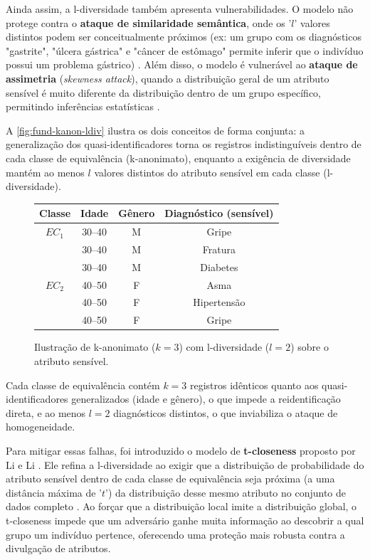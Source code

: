 Ainda assim, a l-diversidade também apresenta vulnerabilidades. O modelo não protege contra o \textbf{ataque de similaridade semântica}, onde os '$l$' valores distintos podem ser conceitualmente próximos (ex: um grupo com os diagnósticos "gastrite", "úlcera gástrica" e "câncer de estômago" permite inferir que o indivíduo possui um problema gástrico) \cite{Olatunji2024}. Além disso, o modelo é vulnerável ao \textbf{ataque de assimetria} (\textit{skewness attack}), quando a distribuição geral de um atributo sensível é muito diferente da distribuição dentro de um grupo específico, permitindo inferências estatísticas \cite{Zuo2021Data}.

A \autoref{fig:fund-kanon-ldiv} ilustra os dois conceitos de forma conjunta: a generalização dos quasi-identificadores torna os registros indistinguíveis dentro de cada classe de equivalência (k-anonimato), enquanto a exigência de diversidade mantém ao menos $l$ valores distintos do atributo sensível em cada classe (l-diversidade).

\begin{figure}[H]
\centering
\caption{Ilustração de k-anonimato ($k=3$) com l-diversidade ($l=2$) sobre o atributo sensível.}
\label{fig:fund-kanon-ldiv}
\begin{tabular}{c|cc|c}
\hline
\textbf{Classe} & \textbf{Idade} & \textbf{Gênero} & \textbf{Diagnóstico (sensível)} \\ \hline
$EC_1$ & 30--40 & M & Gripe \\
       & 30--40 & M & Fratura \\
       & 30--40 & M & Diabetes \\ \hline
$EC_2$ & 40--50 & F & Asma \\
       & 40--50 & F & Hipertensão \\
       & 40--50 & F & Gripe \\ \hline
\end{tabular}
\end{figure}

Cada classe de equivalência contém $k=3$ registros idênticos quanto aos quasi-identificadores generalizados (idade e gênero), o que impede a reidentificação direta, e ao menos $l=2$ diagnósticos distintos, o que inviabiliza o ataque de homogeneidade.

Para mitigar essas falhas, foi introduzido o modelo de \textbf{t-closeness} proposto por Li e Li \cite{Li2007}. Ele refina a l-diversidade ao exigir que a distribuição de probabilidade do atributo sensível dentro de cada classe de equivalência seja próxima (a uma distância máxima de '$t$') da distribuição desse mesmo atributo no conjunto de dados completo \cite{Zuo2021Data, Olatunji2024}. Ao forçar que a distribuição local imite a distribuição global, o t-closeness impede que um adversário ganhe muita informação ao descobrir a qual grupo um indivíduo pertence, oferecendo uma proteção mais robusta contra a divulgação de atributos.

